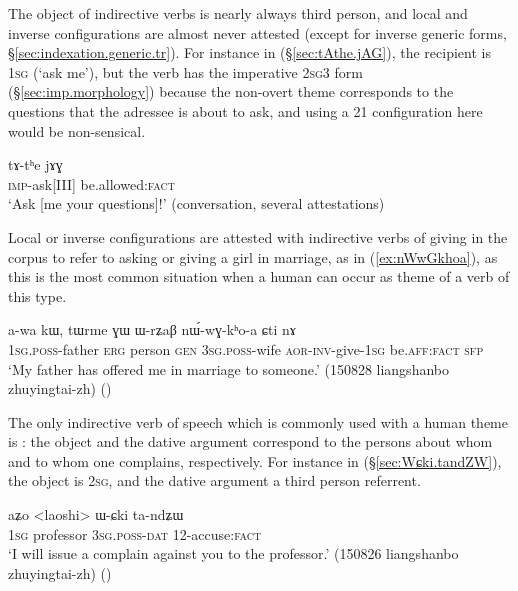 The object of indirective verbs is nearly always third person, and local and inverse configurations are almost never attested (except for inverse generic forms, §\ref{sec:indexation.generic.tr}). For instance in (§\ref{sec:tAthe.jAG}), the recipient is \textsc{1sg} (`ask me'), but the verb  has the imperative \textsc{2sg}\fl{}3 form (§\ref{sec:imp.morphology}) because the non-overt theme corresponds to the questions that the adressee is about to ask, and using a 2\fl{}1 configuration here would be non-sensical.

\begin{exe}
	\ex \label{sec:tAthe.jAG}
	\gll  tɤ-tʰe jɤɣ \\
	\textsc{imp}-ask[III] be.allowed:\textsc{fact} \\
	\glt `Ask [me your questions]!' (conversation, several attestations)
\end{exe}

Local or inverse configurations are attested with indirective verbs of giving in the corpus to refer to asking or giving a girl in marriage, as in (\ref{ex:nWwGkhoa}), as this is the most common situation when a human can occur as theme of a verb of this type.

\begin{exe}
	\ex \label{ex:nWwGkhoa}
	\gll  a-wa kɯ, tɯrme ɣɯ ɯ-rʑaβ nɯ́-wɣ-kʰo-a ɕti nɤ \\
	\textsc{1sg}.\textsc{poss}-father \textsc{erg} person \textsc{gen} \textsc{3sg}.\textsc{poss}-wife \textsc{aor}-\textsc{inv}-give-\textsc{1sg} be.\textsc{aff}:\textsc{fact} \textsc{sfp} \\
	\glt `My father has offered me in marriage to someone.' (150828 liangshanbo zhuyingtai-zh)
()
\end{exe}

The only indirective verb of speech which is commonly used with a human theme is : the object and the dative argument correspond to the persons about whom and to whom one complains, respectively. For instance in (§\ref{sec:Wɕki.tandZW}), the object is \textsc{2sg}, and the dative argument a third person referrent.

\begin{exe}
	\ex \label{sec:Wɕki.tandZW}
	\gll  aʑo <laoshi> ɯ-ɕki ta-ndʑɯ \\
	\textsc{1sg} professor \textsc{3sg}.\textsc{poss}-\textsc{dat} 1\fl{}2-accuse:\textsc{fact} \\
	\glt `I will issue a complain against you to the professor.' (150826 liangshanbo zhuyingtai-zh) ()
\end{exe}

